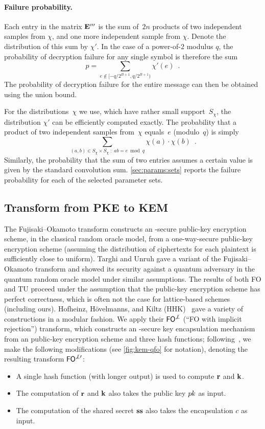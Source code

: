 \documentclass{iacrcc}
\begin{document}
\paragraph{Failure probability.}

Each entry in the matrix $\mathbf{E}'''$ is the sum of~$2n$ products of two
independent samples from $\chi$, and one more independent sample from
$\chi$. Denote the distribution of this sum by $\chi'$. In the case of
a power-of-$2$ modulus $q$, the probability of decryption failure for
any single symbol is therefore the sum
\[ p = \sum_{e \notin [-q/2^{B+1},q/2^{B+1})}\chi'(e) \enspace. \]
The probability of decryption failure for the entire message can then
be obtained using the union bound.

For the distributions~$\chi$ we use, which have rather small
support~$S_{\chi}$, the distribution $\chi'$ can be efficiently
computed exactly. The probability that a product of two independent
samples from~$\chi$ equals~$e$ (modulo~$q$) is simply
\[ \sum_{(a,b)\in S_\chi\times S_\chi\; :\; a b = e \bmod q}
  \chi(a)\cdot \chi(b) \enspace. \] Similarly, the probability that
the sum of two entries assumes a certain value is given by the
standard convolution sum.  \autoref{sec:params:sets} reports the
failure probability for each of the selected parameter sets.

\subsection{Transform from \INDCPA PKE to \INDCCA KEM}\label{sec:cca-transform}

The Fujisaki--Okamoto transform \cite{C:FujOka99} constructs an
\INDCCATwo-secure public-key encryption scheme, in the classical
random oracle model, from a one-way-secure public-key encryption
scheme (assuming the distribution of ciphertexts for each plaintext is
sufficiently close to uniform).  Targhi and Unruh \cite{TCC:TarUnr16}
gave a variant of the Fujisaki--Okamoto transform and showed its
\INDCCATwo security against a quantum adversary in the quantum random
oracle model under similar assumptions.  The results of both FO and TU
proceed under the assumption that the public-key encryption scheme has
perfect correctness, which is often not the case for lattice-based
schemes (including ours).  Hofheinz, H{\" o}velmanns, and Kiltz
(HHK)~\cite{TCC:HofHovKil17} gave a variety of constructions in a
modular fashion.  We apply their $\textsf{\upshape\mdseries FO}^{\not\perp}$ (``FO with implicit
rejection'') transform, which constructs an \INDCCA-secure key
encapsulation mechanism from an \INDCPA public-key encryption scheme
and three hash functions; following~\cite{EuroSP:Kyber}, we make the
following modifications (see \autoref{fig:kem-qfo} for notation),
denoting the resulting transform $\textsf{\upshape\mdseries FO}^{\not\perp\prime}$:
\begin{itemize}
\item A single hash function (with longer output) is used to compute $\mathbf{r}$ and $\mathbf{k}$.
\item The computation of $\mathbf{r}$ and $\mathbf{k}$ also takes the public key $p\mkern-0.5muk$ as input.
\item The computation of the shared secret $\mathbf{s}\mathbf{s}$ also takes the encapsulation $c$ as input.
\end{itemize}
\end{document}
